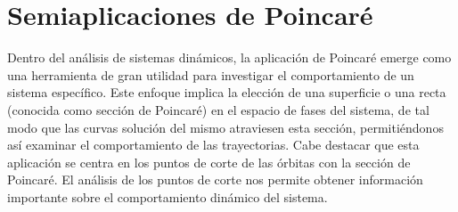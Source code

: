 \documentclass[12pt,a4paper]{report} %
\begin{document}

	
	\chapter{Semiaplicaciones de Poincaré}
	\label{sec:4}
	
	Dentro del análisis de sistemas dinámicos, la aplicación de Poincaré emerge como una herramienta de gran utilidad para investigar el comportamiento de un sistema específico. Este enfoque implica la elección de una superficie o una recta (conocida como sección de Poincaré) en el espacio de fases del sistema, de tal modo que las curvas solución del mismo atraviesen esta sección, permitiéndonos así examinar el comportamiento de las trayectorias. Cabe destacar que esta aplicación se centra en los puntos de corte de las órbitas con la sección de Poincaré. El análisis de los puntos de corte nos permite obtener información importante sobre el comportamiento dinámico del sistema.
	
\end{document}
